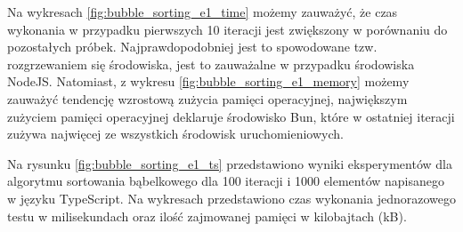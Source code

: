 Na wykresach \ref{fig:bubble_sorting_e1_time} możemy zauważyć, że czas wykonania w przypadku pierwszych 10 iteracji jest zwiększony w porównaniu do pozostałych próbek. Najprawdopodobniej jest to spowodowane tzw. rozgrzewaniem się środowiska, jest to zauważalne w przypadku środowiska NodeJS. Natomiast, z wykresu \ref{fig:bubble_sorting_e1_memory} możemy zauważyć tendencję wzrostową zużycia pamięci operacyjnej, największym zużyciem pamięci operacyjnej deklaruje środowisko Bun, które w ostatniej iteracji zużywa najwięcej ze wszystkich środowisk uruchomieniowych. 

Na rysunku \ref{fig:bubble_sorting_e1_ts} przedstawiono wyniki eksperymentów dla algorytmu sortowania bąbelkowego dla 100 iteracji i 1000 elementów napisanego w języku TypeScript. Na wykresach przedstawiono czas wykonania jednorazowego testu w milisekundach oraz ilość zajmowanej pamięci w kilobajtach (kB).


